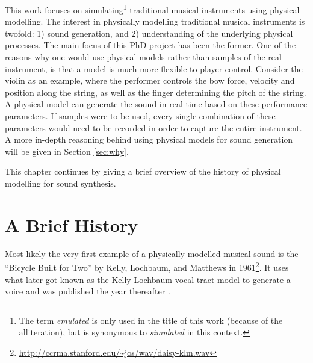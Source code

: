 This work focuses on simulating\footnote{The term \textit{emulated} is only used in the title of this work (because of the alliteration), but is synonymous to \textit{simulated} in this context.} traditional musical instruments using physical modelling. 
The interest in physically modelling traditional musical instruments is twofold: 1) sound generation, and 2) understanding of the underlying physical processes. The main focus of this PhD project has been the former. One of the reasons why one would use physical models rather than samples of the real instrument, is that a model is much more flexible to player control. Consider the violin as an example, where the performer controls the bow force, velocity and position along the string, as well as the finger determining the pitch of the string. A physical model can generate the sound in real time based on these performance parameters. If samples were to be used, every single combination of these parameters would need to be recorded in order to capture the entire instrument.
A more in-depth reasoning behind using physical models for sound generation will be given in Section \ref{sec:why}.

This chapter continues by giving a brief overview of the history of physical modelling for sound synthesis.

\section{A Brief History}\label{sec:history}


Most likely the very first example of a physically modelled musical sound is the ``Bicycle Built for Two'' by Kelly, Lochbaum, and Matthews in 1961\footnote{\url{http://ccrma.stanford.edu/~jos/wav/daisy-klm.wav}}. It uses what later got known as the Kelly-Lochbaum vocal-tract model to generate a voice and was published the year thereafter \cite{Kelly1962}. 

